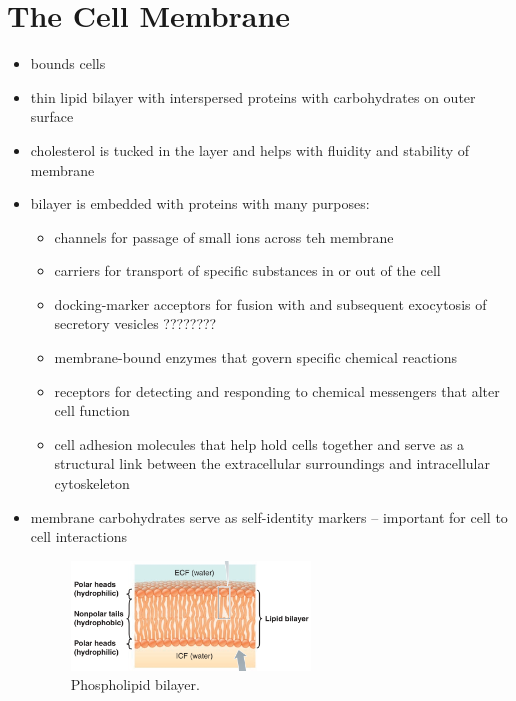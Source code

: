 \documentclass[10pt]{article}
\begin{document}
\section{The Cell Membrane}
\begin{itemize}
    \item bounds cells
    \item thin lipid bilayer with interspersed proteins with carbohydrates on outer surface
    \item cholesterol is tucked in the layer and helps with fluidity and stability of membrane
    \item bilayer is embedded with proteins with many purposes:
        \begin{itemize}
            \item channels for passage of small ions across teh membrane 
            \item carriers for transport of specific substances in or out of the cell 
            \item docking-marker acceptors for fusion with and subsequent exocytosis of secretory vesicles ????????
            \item membrane-bound enzymes that govern specific chemical reactions 
            \item receptors for detecting and responding to chemical messengers that alter cell function 
            \item cell adhesion molecules that help hold cells together and serve as a structural link between the extracellular surroundings and intracellular cytoskeleton
        \end{itemize}
    \item membrane carbohydrates serve as self-identity markers -- important for cell to cell interactions
        \begin{figure}[h]
            \centering
            \includegraphics[width=0.6\textwidth]{phospholipidBilayer}
            \caption{Phospholipid bilayer.}
            \label{fig:phospholipidBilayer}
        \end{figure}
        \begin{figure}[h]
            \centering

\end{figure}
\end{itemize}
\end{document}
